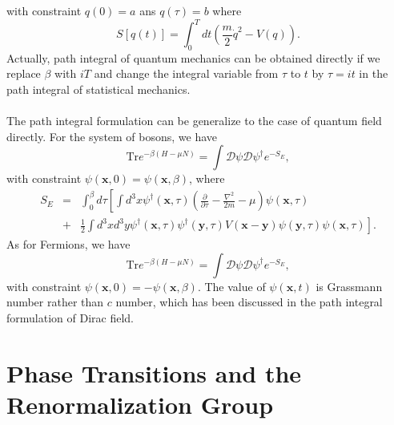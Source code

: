 with constraint $q(0) = a$ ans $q(\tau) = b$
where
\[S[q(t)] = \int_0^{T} dt \left(\frac{m}{2}\dot{q}^2 - V(q) \right).\]
Actually, path integral of quantum mechanics can be obtained directly if we replace $\beta$ with $iT$ and change the integral variable from $\tau$ to $t$ by $\tau = it$ in the path integral  of statistical mechanics.
\\ \\
The path integral formulation can be generalize to the case of quantum field directly. For the system of bosons, we have
\[\mathrm{Tr}e^{-\beta (H-\mu N)} = \int \mathcal{D}\psi \mathcal{D}\psi^{\dagger} e^{-S_E},\]
with constraint $\psi(\bm{x},0) = \psi(\bm{x},\beta)$,
where
\begin{eqnarray}
S_E &=& \int_0^{\beta}d\tau \left[ \int d^3x \psi^{\dagger}(\bm{x},\tau) \left( \frac{\partial}{\partial \tau} - \frac{\nabla^2}{2m} -\mu \right) \psi(\bm{x},\tau) \right. \nonumber \\
&+& \left. \frac{1}{2}\int d^3x d^3y\psi^{\dagger}(\bm{x},\tau)\psi^{\dagger}(\bm{y},\tau)V(\bm{x}-\bm{y})\psi(\bm{y},\tau)\psi(\bm{x},\tau) \right] .\nonumber
\end{eqnarray}
As for Fermions, we have
\[\mathrm{Tr}e^{-\beta (H-\mu N)} = \int \mathcal{D}\psi \mathcal{D}\psi^{\dagger} e^{-S_E},\]
with constraint $\psi(\bm{x},0) = -\psi(\bm{x},\beta)$. 
The value of $\psi(\bm{x},t)$ is Grassmann number rather than $c$ number, which has been discussed in the path integral formulation of Dirac field.

\chapter{Phase Transitions and the Renormalization Group}
